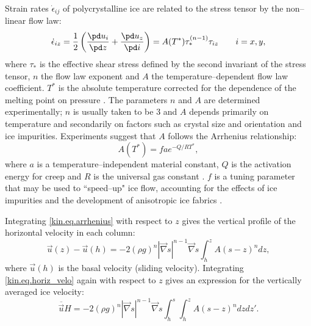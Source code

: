 Strain rates $\dot{\epsilon}_{ij}$ of polycrystalline ice are related to the stress tensor by the non--linear flow law:
\begin{equation}
  \label{kin.eq.flowlaw}
  \dot{\epsilon}_{iz}=\frac12\left(\frac{\pd u_i}{\pd z}+\frac{\pd u_z}{\pd i}\right)=A(T^\ast)\tau_\ast^{(n-1)}\tau_{iz}\qquad i=x,y,
\end{equation}
where $\tau_\ast$ is the effective shear stress defined by the second invariant of the stress tensor, $n$ the flow law exponent and $A$ the temperature--dependent flow law coefficient. $T^\ast$ is the absolute temperature corrected for the dependence of the melting point on pressure \cite[$T^\ast=T+8.7\cdot10^{-4}(H+h-z)$, $T$ in Kelvin,][]{Huybrechts1986}. 
The parameters $n$ and $A$ are determined experimentally; $n$ is usually taken to be 3 and $A$ depends primarily on temperature and secondarily on factors such as crystal
size and orientation and ice impurities. 
Experiments suggest that $A$ follows the Arrhenius relationship:
\begin{equation}
  \label{kin.eq.arrhenius}
  A(T^\ast)=fae^{-Q/RT^\ast},
\end{equation}where $a$ is a temperature--independent material constant, $Q$ is the activation energy for creep and $R$ is the universal gas constant \citep{Paterson1994}. 
$f$ is a tuning parameter that may be used to ``speed--up" ice flow, accounting for the effects of ice impurities and the development of anisotropic ice fabrics \citep{Payne1999,Tarasov1999,Tarasov2000,Peltier2000}.

Integrating \eqref{kin.eq.arrhenius} with respect to $z$ gives the vertical profile of the horizontal velocity in each column:
\begin{equation}
  \label{kin.eq.horiz_velo}
  \vec u(z)-\vec u(h) = -2(\rho g)^n|\vec\nabla s|^{n-1}\vec\nabla s\int_h^zA(s-z)^ndz,
\end{equation}
where $\vec u(h)$ is the basal velocity (sliding velocity). Integrating \eqref{kin.eq.horiz_velo} again with respect to $z$ gives an expression for the vertically averaged ice velocity:
\begin{equation}
  \label{kin.eq.avg_velo}
  \overline{\vec u}H=-2(\rho g)^n|\vec\nabla s|^{n-1}\vec\nabla s\int_h^s\int_h^zA(s-z)^ndzdz'.
\end{equation}


